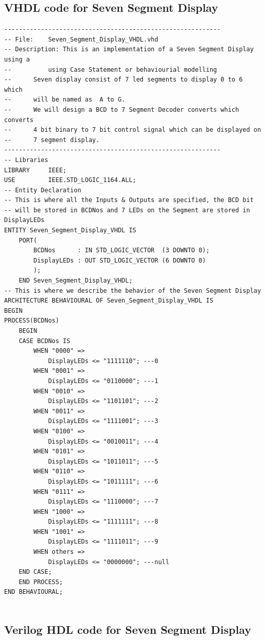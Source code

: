 \documentclass[12pt,singleside,a4paper]{article}
\begin{document}
\subsection{VHDL code for Seven Segment Display }
\begin{lstlisting}[style=VHDL, frame=single,linewidth = 18cm]
-----------------------------------------------------------
-- File:    Seven_Segment_Display_VHDL.vhd
-- Description:	This is an implementation of a Seven Segment Display using a 
--          using Case Statement or behaviourial modelling
--	    Seven display consist of 7 led segments to display 0 to 6 which 
--	    will be named as  A to G.
--	    We will design a BCD to 7 Segment Decoder converts which converts 
--	    4 bit binary to 7 bit control signal which can be displayed on 
--	    7 segment display. 
-----------------------------------------------------------
-- Libraries
LIBRARY 	IEEE;
USE 		IEEE.STD_LOGIC_1164.ALL;
-- Entity Declaration
-- This is where all the Inputs & Outputs are specified, the BCD bit 
-- will be stored in BCDNos and 7 LEDs on the Segment are stored in DisplayLEDs
ENTITY Seven_Segment_Display_VHDL IS
    PORT(
		BCDNos		: IN STD_LOGIC_VECTOR  (3 DOWNTO 0);
		DisplayLEDs	: OUT STD_LOGIC_VECTOR (6 DOWNTO 0)
		);
	END Seven_Segment_Display_VHDL;
-- This is where we describe the behavior of the Seven Segment Display
ARCHITECTURE BEHAVIOURAL OF Seven_Segment_Display_VHDL IS
BEGIN
PROCESS(BCDNos)
    BEGIN
	CASE BCDNos IS
		WHEN "0000" =>
			DisplayLEDs <= "1111110"; ---0
		WHEN "0001" =>
			DisplayLEDs <= "0110000"; ---1
		WHEN "0010" =>
			DisplayLEDs <= "1101101"; ---2
		WHEN "0011" =>
			DisplayLEDs <= "1111001"; ---3
		WHEN "0100" =>
			DisplayLEDs <= "0010011"; ---4
		WHEN "0101" =>
			DisplayLEDs <= "1011011"; ---5
		WHEN "0110" =>
			DisplayLEDs <= "1011111"; ---6
		WHEN "0111" =>
			DisplayLEDs <= "1110000"; ---7
		WHEN "1000" =>
			DisplayLEDs <= "1111111"; ---8
		WHEN "1001" =>
			DisplayLEDs <= "1111011"; ---9
		WHEN others =>
			DisplayLEDs <= "0000000"; ---null
	END CASE;
	END PROCESS;
END BEHAVIOURAL;
 
\end{lstlisting} 
\subsection{ Verilog HDL code for Seven Segment Display }
\end{document}
